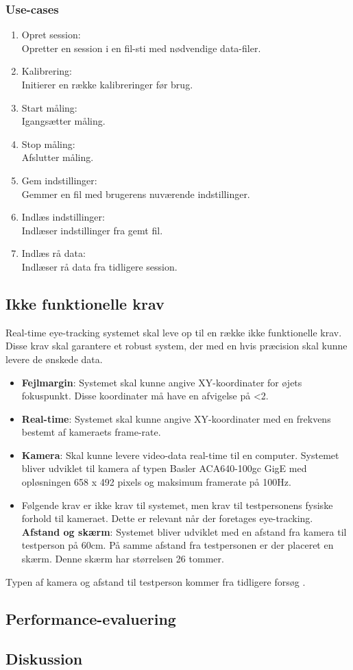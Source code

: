 \documentclass[rapport.tex]{subfiles}
\begin{document}
	\subsubsection{Use-cases}	
	\label{usec}
	\begin{enumerate}
		\item Opret session: \\Opretter en session i en fil-sti med nødvendige data-filer. 
		\item Kalibrering: \\Initierer en række kalibreringer før brug. 
		\item Start måling: \\Igangsætter måling.
		\item Stop måling: \\Afslutter måling.
		\item Gem indstillinger: \\Gemmer en fil med brugerens nuværende indstillinger.
		\item Indlæs indstillinger: \\Indlæser indstillinger fra gemt fil.
		\item Indlæs rå data: \\Indlæser rå data fra tidligere session. 
	\end{enumerate}
	\subsection{Ikke funktionelle krav}
	Real-time eye-tracking systemet skal leve op til en række ikke funktionelle krav. Disse krav skal garantere et robust system, der med en hvis præcision skal kunne levere de ønskede data.\\
	\begin{itemize}
		\item 
		\textbf{Fejlmargin}: Systemet skal kunne angive XY-koordinater for øjets fokuspunkt. Disse koordinater må have en afvigelse på <2\degree \cite{FairchildInSiboska}.
		\item 
		\textbf{Real-time}: Systemet skal kunne angive XY-koordinater med en frekvens bestemt af kameraets frame-rate. 
		\item
		\textbf{Kamera}: Skal kunne levere video-data real-time til en computer. Systemet bliver udviklet til kamera af typen Basler
		ACA640-100gc GigE med opløsningen 658 x 492 pixels og maksimum framerate på 100Hz.
		\item Følgende krav er ikke krav til systemet, men krav til testpersonens fysiske forhold til kameraet. Dette er relevant når der foretages eye-tracking. \\
		\textbf{Afstand og skærm}: Systemet bliver udviklet med en afstand fra kamera til testperson på 60cm. 
		På samme afstand fra testpersonen er der placeret en skærm. Denne skærm har størrelsen 26 tommer.
	\end{itemize}
	
	Typen af kamera og afstand til testperson kommer fra tidligere forsøg \cite{Siboska}.
	\subsection{Performance-evaluering}
	\subsection{Diskussion}
	
		
\end{document}
